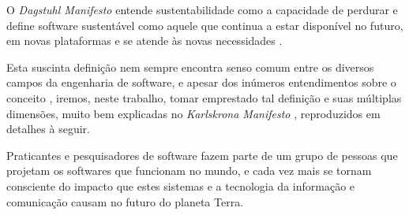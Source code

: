 
O {\it Dagstuhl Manifesto} entende sustentabilidade como a capacidade de 
perdurar e define software sustentável como aquele que continua a estar
disponível no futuro, em novas plataformas e se atende às novas necessidades
\cite{allen2017engineering}.

Esta suscinta definição nem sempre encontra senso comum entre os diversos
campos da engenharia de software, e apesar dos inúmeros entendimentos sobre o
conceito \cite{venters2014software}, iremos, neste trabalho, tomar emprestado
tal definição e suas múltiplas dimensões, muito bem explicadas no {\it
Karlskrona Manifesto} \cite{becker2014karlskrona}, reproduzidos em detalhes à
seguir.

Praticantes e pesquisadores de software fazem parte de um grupo de pessoas que
projetam os softwares que funcionam no mundo, e cada vez mais se tornam
consciente do impacto que estes sistemas e a tecnologia da informação e
comunicação causam no futuro do planeta Terra.

